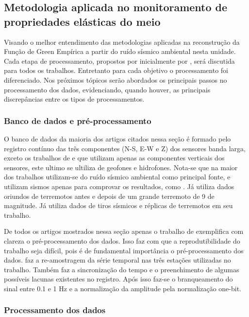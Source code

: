 \documentclass[paper,twocolumn]{geophysics}
\begin{document}
\subsection*{Metodologia aplicada no monitoramento de propriedades elásticas do meio}

Visando o melhor entendimento das metodologias aplicadas na reconstrução da Função de Green Empírica a partir do ruído sísmico ambiental nesta unidade. Cada etapa de processamento, propostos por inicialmente por \cite{bensen_processing_2007}, será discutida para todos os trabalhos. Entretanto para cada objetivo o processamento foi diferenciado. Nos próximos tópicos serão abordados os principais passos no processamento dos dados, evidenciando, quando houver, as principais discrepâncias entre os tipos de processamentos.

\subsubsection*{Banco de dados e pré-processamento}

O banco de dados da maioria dos artigos citados nessa seção é formado pelo registro contínuo das três componentes (N-S, E-W e Z) dos sensores banda larga, exceto os trabalhos de \cite{zaccarelli_variations_2011} e \cite{boullenger_studying_2015} que utilizam apenas as componentes verticais dos sensores, este ultimo se ultiliza de geofones e hidrofones. Nota-se que na maior dos trabalhos utilizam-se do ruído sísmico ambiental como principal fonte, e utilizam sismos apenas para comprovar os resultados, como \cite{prieto_impulse_2010}. Já \cite{nakata_damage_2015} utiliza dados oriundos de terremotos antes e depois de um grande terremoto de 9 de magnitude. Já \cite{li_seismic_2006} utiliza dados de tiros sísmicos e réplicas de terremotos em seu trabalho. 

De todos os artigos mostrados nessa seção apenas o trabalho de \cite{zaccarelli_variations_2011} exemplifica com clareza o pré-processamento dos dados. Isso faz com que a reprodutibilidade do trabalho seja difícil, pois é de fundamental importância o pré-processamento dos dados. \cite{zaccarelli_variations_2011} faz a re-amostragem da série temporal nas três estações utilizadas no trabalho. Também faz a sincronização do tempo e o preenchimento de algumas possíveis lacunas existentes no registro. Após isso faz-se o branqueamento do sinal entre 0.1 e 1 Hz e a normalização da amplitude pela normalização one-bit. 

\subsubsection*{Processamento dos dados}
\end{document}

